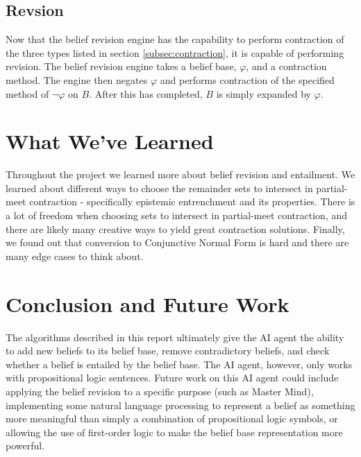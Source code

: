 \documentclass[a4paper,10pt]{article}
\begin{document}
\subsection{Revsion}
\label{subsec:revision}
Now that the belief revision engine has the capability to perform contraction of the three types listed in section \ref{subsec:contraction}, it is capable of performing revision. The belief revision engine takes a belief base, $\varphi$, and a contraction method. The engine then negates $\varphi$ and performs contraction of the specified method of $\neg\varphi$ on $B$. After this has completed, $B$ is simply expanded by $\varphi$.


\section{What We've Learned}
\label{sec:learned}
Throughout the project we learned more about belief revision and entailment. We learned about different ways to choose the remainder sets to intersect in partial-meet contraction - specifically epistemic entrenchment and its properties. There is a lot of freedom when choosing sets to intersect in partial-meet contraction, and there are likely many creative ways to yield great contraction solutions. Finally, we found out that conversion to Conjunctive Normal Form is hard and there are many edge cases to think about.

\section{Conclusion and Future Work}
\label{sec:conclusion}
The algorithms described in this report ultimately give the AI agent the ability to add new beliefs to its belief base, remove contradictory beliefs, and check whether a belief is entailed by the belief base. The AI agent, however, only works with propositional logic sentences. Future work on this AI agent could include applying the belief revision to a specific purpose (such as Master Mind), implementing some natural language processing to represent a belief as something more meaningful than simply a combination of propositional logic symbols, or allowing the use of first-order logic to make the belief base representation more powerful. 


\end{document}

